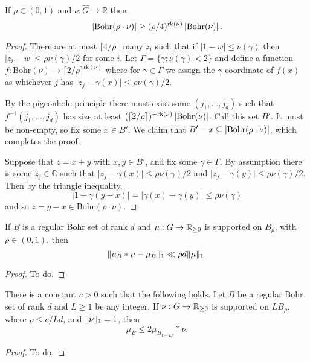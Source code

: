 \begin{lemma}
\label{bohr-size}
If $\rho\in (0,1)$ and $\nu:\widehat{G}\to \mathbb{R}$ then
\[\left\lvert \mathrm{Bohr}(\rho\cdot \nu)\right\rvert\geq (\rho/4)^{\mathrm{rk}(\nu)}\left\lvert \mathrm{Bohr}(\nu)\right\rvert.\]
\end{lemma}
\begin{proof}
There are at most $\lceil 4/\rho\rceil$ many $z_i$ such that if $\lvert 1-w\rvert \leq \nu(\gamma)$ then $\lvert z_i-w\rvert\leq \rho\nu(\gamma)/2$ for some $i$. Let $\Gamma=\{ \gamma : \nu(\gamma) <2\}$ and define a function $f:\mathrm{Bohr}(\nu)\to \lceil 2/\rho\rceil^{\mathrm{rk}(\nu)}$ where for $\gamma\in \Gamma$ we assign the $\gamma$-coordinate of $f(x)$ as whichever $j$ has $\lvert z_j-\gamma(x)\rvert \leq \rho\nu(\gamma)/2$. 

By the pigeonhole principle there must exist some $(j_1,\ldots,j_{d})$ such that $f^{-1}(j_1,\ldots,j_d)$ has size at least $(\lceil 2/\rho\rceil)^{-\mathrm{rk}(\nu)}\left\lvert \mathrm{Bohr}(\nu)\right\rvert$. Call this set $B'$. It must be non-empty, so fix some $x\in B'$. We claim that $B'-x\subseteq \left\lvert \mathrm{Bohr}(\rho\cdot \nu)\right\rvert$, which completes the proof.

Suppose that $z=x+y$ with $x,y\in B'$, and fix some $\gamma\in \Gamma$. By assumption there is some $z_j\in \mathbb{C}$ such that $\lvert z_j-\gamma(x)\rvert \leq \rho \nu(\gamma)/2$ and $\lvert z_j-\gamma(y)\rvert \leq \rho \nu(\gamma)/2$. Then by the triangle inequality, 
\[\lvert 1-\gamma(y-x)\rvert=\lvert \gamma(x)-\gamma(y)\rvert \leq \rho \nu(\gamma)\]
and so $z=y-x\in \mathrm{Bohr}(\rho\cdot \nu)$. 
\end{proof}

\begin{lemma}
\label{reg-conv}
If $B$ is a regular Bohr set of rank $d$ and $\mu:G\to\mathbb{R}_{\geq 0}$ is supported on $B_\rho$, with $\rho \in (0,1)$, then
\[ \lVert  \mu_B*\mu - \mu_B \rVert_{1} \ll \rho d\lVert \mu\rVert_1. \]
\end{lemma}
\begin{proof}
To do.
\end{proof}

\begin{lemma}
\label{bohr-majorise}
There is a constant $c>0$ such that the following holds.  Let $B$ be a regular Bohr set of rank $d$ and $L\geq 1$ be any integer. If $\nu:G\to\mathbb{R}_{\geq 0}$ is supported on $L B_\rho$, where $\rho \leq c/Ld$, and $\lVert \nu\rVert_1=1$, then
\[\mu_B \leq 2\mu_{B_{1+L\rho}}\ast \nu.\]
\end{lemma}
\begin{proof}
To do.
\end{proof}

